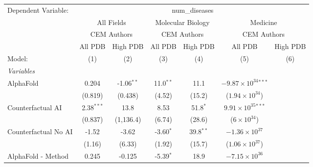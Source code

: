 \begingroup
\centering
\begin{tabular}{lcccccc}
   \tabularnewline \midrule \midrule
   Dependent Variable: & \multicolumn{6}{c}{num\_diseases}\\
 & \multicolumn{2}{c}{All Fields} & \multicolumn{2}{c}{Molecular Biology} & \multicolumn{2}{c}{Medicine} \\
\cmidrule(lr){2-3} \cmidrule(lr){4-5} \cmidrule(lr){6-7}
 & \multicolumn{2}{c}{CEM Authors} & \multicolumn{2}{c}{CEM Authors} & \multicolumn{2}{c}{CEM Authors} \\
\cmidrule(lr){2-3} \cmidrule(lr){4-5} \cmidrule(lr){6-7}
 & \multicolumn{1}{c}{All PDB} & \multicolumn{1}{c}{High PDB} & \multicolumn{1}{c}{All PDB} & \multicolumn{1}{c}{High PDB} & \multicolumn{1}{c}{All PDB} & \multicolumn{1}{c}{High PDB} \\
\cmidrule(lr){2-2} \cmidrule(lr){3-3} \cmidrule(lr){4-4} \cmidrule(lr){5-5} \cmidrule(lr){6-6} \cmidrule(lr){7-7}
   Model:                                                     & (1)          & (2)          & (3)           & (4)         & (5)                            & (6)\\  
   \midrule
   \emph{Variables}\\
   AlphaFold                                                  & 0.204        & -1.06$^{**}$ & 11.0$^{**}$   & 11.1        & $-9.87\times 10^{34}$$^{***}$  &   \\   
                                                              & (0.819)      & (0.438)      & (4.52)        & (15.2)      & ($1.94\times 10^{34}$)         &   \\   
   Counterfactual AI                                          & 2.38$^{***}$ & 13.8         & 8.53          & 51.8$^{*}$  & $9.91\times 10^{35}$$^{***}$   &   \\   
                                                              & (0.837)      & (1,136.4)    & (6.74)        & (28.6)      & ($6\times 10^{34}$)            &   \\   
   Counterfactual No AI                                       & -1.52        & -3.62        & -3.60$^{*}$   & 39.8$^{**}$ & $-1.36\times 10^{37}$          &   \\   
                                                              & (1.16)       & (6.33)       & (1.92)        & (15.7)      & ($1.06\times 10^{37}$)         &   \\   
   AlphaFold - Method                                         & 0.245        & -0.125       & -5.39$^{*}$   & 18.9        & $-7.15\times 10^{36}$          &   \\   

\end{tabular}
